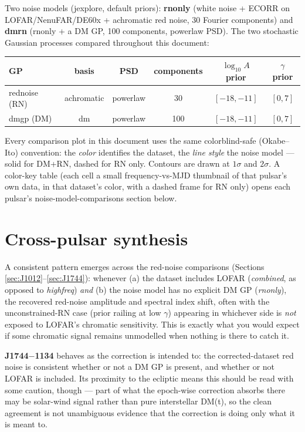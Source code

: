 \documentclass[11pt]{article}
\begin{document}
Two noise models (jexplore, default priors): \textbf{rnonly} (white noise +
ECORR on LOFAR/NenuFAR/DE60x + achromatic red noise, 30 Fourier components)
and \textbf{dmrn} (rnonly + a DM GP, 100 components, powerlaw PSD). The two
stochastic Gaussian processes compared throughout this document:

\begin{center}
\renewcommand{\arraystretch}{1.3}
\begin{tabular}{l c c c c c}
\toprule
\textbf{GP} & basis & PSD & components & $\log_{10}A$ prior & $\gamma$ prior \\
\midrule
rednoise (RN) & achromatic & powerlaw & 30  & $[-18, -11]$ & $[0, 7]$ \\
dmgp (DM)     & dm         & powerlaw & 100 & $[-18, -11]$ & $[0, 7]$ \\
\bottomrule
\end{tabular}
\end{center}

Every comparison plot in this document uses the same colorblind-safe
(Okabe--Ito) convention: the \emph{color} identifies the dataset, the
\emph{line style} the noise model --- solid for DM+RN, dashed for RN only.
Contours are drawn at $1\sigma$ and $2\sigma$. A color-key table (each cell
a small frequency-vs-MJD thumbnail of that pulsar's own data, in that
dataset's color, with a dashed frame for RN only) opens each pulsar's
noise-model-comparisons section below.





\section{Cross-pulsar synthesis}

A consistent pattern emerges across the red-noise comparisons (Sections
\ref{sec:J1012}--\ref{sec:J1744}): whenever (a) the dataset includes LOFAR
(\emph{combined}, as opposed to \emph{highfreq}) \emph{and} (b) the noise
model has no explicit DM GP (\emph{rnonly}), the recovered red-noise
amplitude and spectral index shift, often with the unconstrained-RN case
(prior railing at low $\gamma$) appearing in whichever side is \emph{not}
exposed to LOFAR's chromatic sensitivity. This is exactly what you would
expect if some chromatic signal remains unmodelled when nothing is there to
catch it.

\textbf{J1744$-$1134} behaves as the correction is intended to: the
corrected-dataset red noise is consistent whether or not a DM GP is present,
and whether or not LOFAR is included. Its proximity to the ecliptic means
this should be read with some caution, though --- part of what the epoch-wise
correction absorbs there may be solar-wind signal rather than pure
interstellar DM(t), so the clean agreement is not unambiguous evidence that
the correction is doing only what it is meant to.
\end{document}
